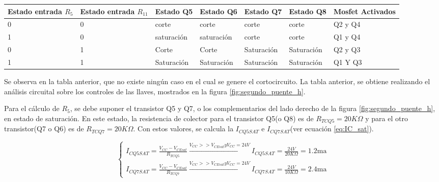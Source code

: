 \begin{table}[ht!]
	\centering
	\hspace{-10mm}
	\begin{tabular}{|p{2cm}|p{2cm}|p{2cm}|p{2cm}|p{2cm}|p{2cm}|p{2cm}|}
		\hline
		Estado entrada $R_5$ & Estado entrada $R_11$& Estado Q5 & Estado Q6&Estado Q7&Estado Q8&Mosfet Activados \\ \hline   
		0 & 0&corte &corte &corte &corte &Q2 y Q4 \\ \hline 
		1&0&saturación&saturación& corte& corte &Q1 y Q4 \\ \hline
		0& 1& Corte& Corte &Saturación& Saturación &Q2 y Q3 \\ \hline
		1 &1 &Saturación &Saturación& Saturación& Saturación& Q1 Y Q3 \\ \hline
	\end{tabular}
\end{table}

Se observa en la tabla anterior, que no existe ningún caso en el cual se genere el cortocircuito. La tabla anterior, se obtiene realizando el análisis circuital sobre los controles de
las llaves, mostrados en la figura \ref{fig:segundo_puente_h}. 

Para el cálculo de $R_5$, se debe suponer el transistor Q5 y Q7, o los complementarios del lado derecho de la figura \ref{fig:segundo_puente_h}, en estado de saturación. En este estado, la resistencia de colector para el transistor Q5(o Q8) es de $R_{TCQ5}=20K\Omega$ y para el otro transistor(Q7 o Q6) es de $R_{TCQ7}=20K\Omega$. Con estos valores, se calcula la $I_{CQ5SAT}$ e
$I_{CQ7SAT}$(ver ecuación \ref{eq:IC_sat}). 

\begin{equation}
	\begin{cases}
		I_{CQ5SAT} = \frac{V_{CC}-V_{CEsat}}{R_{TCQ5}}\xrightarrow{V_{CC}>>V_{CEsat} y V_{CC}=24V }I_{CQ5SAT} = \frac{24V}{20K\Omega} = 1.2\text{ma} \\ 			
		I_{CQ7SAT} = \frac{V_{CC}-V_{CEsat}}{R_{TCQ7}}\xrightarrow{V_{CC}>>V_{CEsat} y V_{CC}=24V }I_{CQ7SAT} = \frac{24V}{10K\Omega} = 2.4\text{ma}  	
	\end{cases}
\end{equation}

